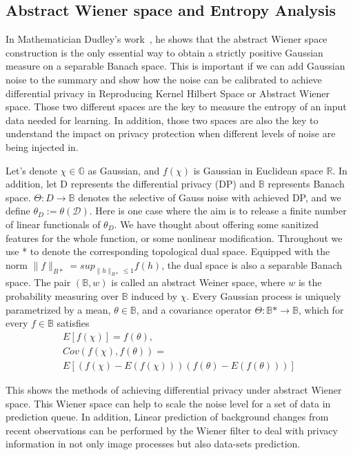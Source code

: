 \documentclass[journal,transmag]{IEEEtran}
\begin{document}
\subsection{Abstract Wiener space and Entropy Analysis}
\nobreak
In Mathematician Dudley's work~\cite{dudley1971seminorms}, he shows that the abstract Wiener space construction is the only essential way to obtain a strictly positive Gaussian measure on a separable Banach space. This is important if we can add Gaussian noise to the summary and show how the noise can be calibrated to achieve differential privacy in Reproducing Kernel Hilbert Space or Abstract Wiener space. Those two different spaces are the key to measure the entropy of an input data needed for learning. In addition, those two spaces are also the key to understand the impact on privacy protection when different levels of noise are being injected in.

Let’s denote $\chi\in \mathbb{G}$ as Gaussian, and $f(\chi)$ is Gaussian in Euclidean space $\mathbb{R}$. In addition, let D represents the differential privacy (DP) and $\mathbb{B}$ represents Banach space. $\Theta: D\rightarrow \mathbb{B}$ denotes the selective of Gauss noise with achieved DP, and we define $\theta_D := \theta(\mathcal{D})$. Here is one case where the aim is to release a finite number of linear functionals of $\theta_D$. We have thought about offering some sanitized features for the whole function, or some nonlinear modification. Throughout we use * to denote the corresponding topological dual space. Equipped with the norm $\| f \|_{B*}=sup_{\|h\|_{B*} \leq 1} f(h)$, the dual space is also a separable Banach space. The pair $(\mathbb{B},w)$ is called an abstract Weiner space, where $w$ is the probability measuring over $\mathbb{B}$ induced by $\chi$. Every Gaussian process is uniquely parametrized by a mean, $\theta \in \mathbb{B}$, and a covariance operator $\Theta:\mathbb{B}*\rightarrow \mathbb{B}$, which for every $f\in \mathbb{B} $ satisfies
\begin{equation}
\begin{array}{ll}
    E[f(\chi)] = f(\theta), \\
    Cov(f(\chi),f(\theta)) = \\
    E[(f(\chi)-E(f(\chi)))(f(\theta)-E(f(\theta)))]
\end{array}
\end{equation}

This shows the methods of achieving differential privacy under abstract Wiener space. This Wiener space can help to scale the noise level for a set of data in prediction queue. In addition, Linear prediction of background changes from recent observations can be performed by the Wiener filter to deal with privacy information in not only image processes but also data-sets prediction.
\end{document}
